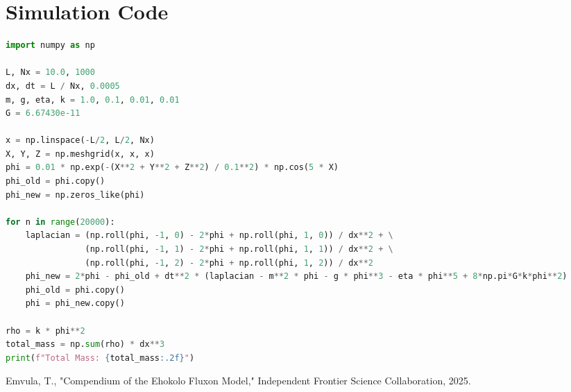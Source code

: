 \documentclass[11pt]{article}
\begin{document}
\appendix
\section{Simulation Code}
\begin{lstlisting}[language=Python]
import numpy as np

L, Nx = 10.0, 1000
dx, dt = L / Nx, 0.0005
m, g, eta, k = 1.0, 0.1, 0.01, 0.01
G = 6.67430e-11

x = np.linspace(-L/2, L/2, Nx)
X, Y, Z = np.meshgrid(x, x, x)
phi = 0.01 * np.exp(-(X**2 + Y**2 + Z**2) / 0.1**2) * np.cos(5 * X)
phi_old = phi.copy()
phi_new = np.zeros_like(phi)

for n in range(20000):
    laplacian = (np.roll(phi, -1, 0) - 2*phi + np.roll(phi, 1, 0)) / dx**2 + \
                (np.roll(phi, -1, 1) - 2*phi + np.roll(phi, 1, 1)) / dx**2 + \
                (np.roll(phi, -1, 2) - 2*phi + np.roll(phi, 1, 2)) / dx**2
    phi_new = 2*phi - phi_old + dt**2 * (laplacian - m**2 * phi - g * phi**3 - eta * phi**5 + 8*np.pi*G*k*phi**2)
    phi_old = phi.copy()
    phi = phi_new.copy()

rho = k * phi**2
total_mass = np.sum(rho) * dx**3
print(f"Total Mass: {total_mass:.2f}")
\end{lstlisting}




\begin{thebibliography}{9}
Emvula, T., "Compendium of the Ehokolo Fluxon Model," Independent Frontier Science Collaboration, 2025.
\end{thebibliography}
\end{document}
